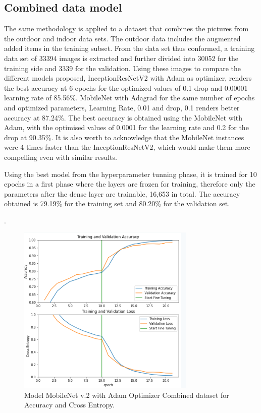 \documentclass[conference]{IEEEtran}
\begin{document}
\subsection{Combined data model}

The same methodology is applied to a dataset that combines the pictures from the outdoor and indoor data sets. The outdoor data includes the augmented added items in the training subset. From the data set thus conformed, a training data set of 33394 images is extracted and further divided into 30052 for the training side and 3339 for the validation. Using these images to compare the different models proposed, InceptionResNetV2 with Adam as optimizer, renders the best accuracy at 6 epochs for the optimized values of 0.1 drop and 0.00001 learning rate of 85.56\%. MobileNet with Adagrad  for the same number of epochs and optimized parameters, Learning Rate, 0.01 and drop, 0.1 renders better accuracy at 87.24\%. The best accuracy is obtained using the MobileNet with Adam, with the optimised values of 0.0001 for the learning rate and 0.2 for the drop at 90.35\%. It is also worth to acknowledge that the MobileNet instances were 4 times faster than the InceptionResNetV2, which would make them more compelling even with similar results. 

Using the best model from the hyperparameter tunning phase, it is trained for 10 epochs in a first phase where the layers are frozen for training, therefore only the parameters after the dense layer are trainable, 16,653 in total. The accuracy obtained is 79.19\% for the training set and 80.20\% for the validation set.  \

. \
\begin{figure}[htbp]
\centerline{\includegraphics[width=8.5cm]{ModelCombineAccCEntropy.png}}
\caption{Model MobileNet v.2 with Adam Optimizer Combined dataset for Accuracy and Cross Entropy.}
\label{fig}
\end{figure}
\end{document}
